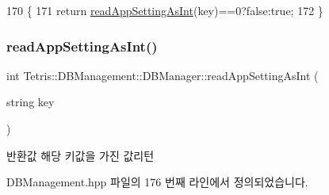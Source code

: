 \begin{DoxyCode}
170                                                  \{
171                 \textcolor{keywordflow}{return} \hyperlink{class_tetris_1_1_d_b_management_1_1_d_b_manager_ac52daf6ea2310b848278454c30698436}{readAppSettingAsInt}(key)==0?\textcolor{keyword}{false}:\textcolor{keyword}{true};
172             \}
\end{DoxyCode}
\mbox{\label{class_tetris_1_1_d_b_management_1_1_d_b_manager_ac52daf6ea2310b848278454c30698436}} 
\subsubsection{\texorpdfstring{read\+App\+Setting\+As\+Int()}{readAppSettingAsInt()}}
{\footnotesize\ttfamily int Tetris\+::\+D\+B\+Management\+::\+D\+B\+Manager\+::read\+App\+Setting\+As\+Int (\begin{DoxyParamCaption}\item[{string}]{key }\end{DoxyParamCaption})\hspace{0.3cm}{\ttfamily [inline]}}

\begin{DoxyReturn}{반환값}
해당 키값을 가진 값리턴 
\end{DoxyReturn}


D\+B\+Management.\+hpp 파일의 176 번째 라인에서 정의되었습니다.


